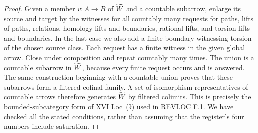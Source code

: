 \begin{proof}
Given a member $v:A\to B$ of $\widetilde W$ and a countable subarrow, enlarge
its source and target by the witnesses for all countably many requests
for paths, lifts of paths, relations, homology lifts and boundaries,
rational lifts, and torsion lifts and boundaries.  In the last case we
also add a finite boundary witnessing torsion of the chosen source
class.  Each request has a finite witness in the given global arrow.
Close under composition and repeat countably many times.  The union is
a countable subarrow in $\widetilde W$, because every finite request occurs and
is answered.  The same construction beginning with a countable union
proves that these subarrows form a filtered cofinal family.  A set of
isomorphism representatives of countable arrows therefore generates
$\widetilde W$ by filtered colimits.  This is precisely the bounded-subcategory
form of XVI Loc~(9) used in REVLOC F.1.  We have checked all the stated
conditions, rather than assuming that the register's four numbers
include saturation.
\end{proof}

